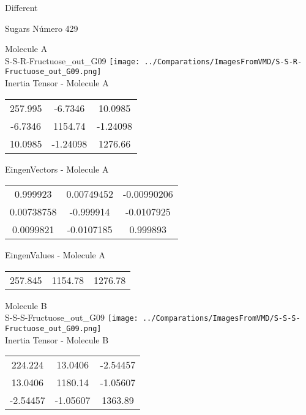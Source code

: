 \begin{center}
\vtab
\vtab
\textcolor{NavyBlue}{\Large Different}
\end{center}

 \newpage

\vtab[-2cm]
\begin{center}
{\large Sugars \tab Número 429}
\end{center}
\begin{multicols}{2}
\begin{center}

Molecule A \\ 
S-S-R-Fructuose\_out\_G09
\texttt{[image: ../Comparations/ImagesFromVMD/S-S-R-Fructuose\_out\_G09.png]}
\\
Inertia Tensor - Molecule A \\
\vtab

\begin{tabular}{|c c c|}
257.995	 & 	-6.7346	 & 	10.0985	 \\
-6.7346	 & 	1154.74	 & 	-1.24098	 \\
10.0985	 & 	-1.24098	 & 	1276.66
\end{tabular}

\vtab
 EingenVectors - Molecule A     \\
\vtab
\begin{tabular}{|c c c|}
0.999923	 & 	0.00749452	 & 	-0.00990206	 \\
0.00738758	 & 	-0.999914	 & 	-0.0107925	 \\
0.0099821	 & 	-0.0107185	 & 	0.999893
\end{tabular}

\vtab
 EingenValues - Molecule A     \\
\vtab
\begin{tabular}{|c c c|}
257.845	 & 	1154.78	 & 	1276.78	 \\
\end{tabular}
\columnbreak

Molecule B \\ 
S-S-S-Fructuose\_out\_G09
\texttt{[image: ../Comparations/ImagesFromVMD/S-S-S-Fructuose\_out\_G09.png]}
\\
Inertia Tensor - Molecule B \\
\vtab

\begin{tabular}{|c c c|}
224.224	 & 	13.0406	 & 	-2.54457	 \\
13.0406	 & 	1180.14	 & 	-1.05607	 \\
-2.54457	 & 	-1.05607	 & 	1363.89
\end{tabular}


\end{center}
\end{multicols}
